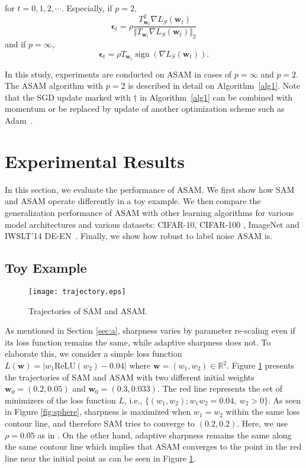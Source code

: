 \documentclass{article}
\newcommand{\mf}[1]{\mathbf{#1}}
\begin{document}
for $t=0,1,2,\cdots$.
Especially, if $p=2$,
\[\bm{\epsilon}_t = \rho \frac {\displaystyle T^2_{\mf{w}_t} \nabla L_S(\mf{w}_t)} {\displaystyle \Vert T_{\mf{w}_t} \nabla L_S(\mf{w}_t) \Vert_2}\]
and if $p=\infty$,
\[\bm{\epsilon}_t = \rho T_{\mf{w}_t} \operatorname{sign}(\nabla L_S(\mf{w}_t)).\]

In this study, experiments are conducted on ASAM in cases of $p=\infty$ and $p=2$. 
The ASAM algorithm with $p=2$ is described in detail on Algorithm~\ref{alg1}. Note that the SGD \citep{nesterov1983method} update marked with $\dagger$ in Algorithm~\ref{alg1} can be combined with momentum or be replaced by update of another optimization scheme such as Adam~\citep{kingma2015adam}.




\section{Experimental Results} \label{sec:e}
In this section, we evaluate the performance of ASAM.
We first show how SAM and ASAM operate differently in a toy example.
We then compare the generalization performance of ASAM with other learning algorithms for various model architectures and various datasets: CIFAR-10, CIFAR-100 \citep{krizhevsky2009cifar}, ImageNet \citep{imagenet} and IWSLT'14 DE-EN~\citep{cettolo2014report}. Finally, we show how robust to label noise ASAM is.

\subsection{Toy Example} \label{toy}


\begin{figure}
\centering
\captionsetup{justification=centering}
\texttt{[image: trajectory.eps]}
\caption{Trajectories of SAM and ASAM.}\label{contour}
\end{figure}

As mentioned in Section \ref{sec:a}, sharpness varies by parameter re-scaling even if its loss function remains the same, while adaptive sharpness does not.
To elaborate this, we consider a simple loss function $L(\mf{w})=|w_1\mathrm{ReLU}(w_2) - 0.04|$ where $\mf{w}=(w_1,w_2)\in\mathbb{R}^2$.
Figure \ref{contour} presents the trajectories of SAM and ASAM with two different initial weights $\mf{w}_0=(0.2,0.05)$ and $\mf{w}_0=(0.3,0.033)$.
The red line represents the set of minimizers of the loss function $L$, i.e., $\{(w_1,w_2); w_1w_2=0.04,~w_2>0\}$.
As seen in Figure \ref{fig:sphere}, sharpness is maximized when $w_1=w_2$ within the same loss contour line, and therefore SAM tries to converge to $(0.2,0.2)$.
Here, we use $\rho=0.05$ as in \citet{foret2021sharpnessaware}.
On the other hand, adaptive sharpness remains the same along the same contour line which implies that ASAM converges to the point in the red line near the initial point as can be seen in Figure \ref{contour}.
\end{document}
